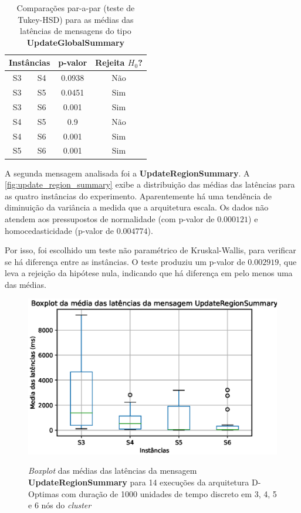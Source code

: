 \begin{table}[ht!]
    \centering
    \caption{Comparações par-a-par (teste de Tukey-HSD) para as médias das latências de mensagens do tipo \textbf{UpdateGlobalSummary}}
    \begin{tabular}{cccc}
    \toprule
    \multicolumn{2}{c}{\textbf{Instâncias}} & \textbf{p-valor} & \textbf{Rejeita $H_0$?}\\
    \midrule
    S3   &  S4  & 0.0938 &  Não \\
    S3   &  S5  & 0.0451 &   Sim \\
    S3   &  S6  &  0.001 &   Sim \\
    S4   &  S5  &    0.9 &  Não \\
    S4   &  S6  &  0.001 &   Sim \\
    S5   &  S6  &  0.001 &   Sim \\
    \bottomrule
    \end{tabular}
    \label{tab:update_global_summary_tukey}
\end{table}

A segunda mensagem analisada foi a \textbf{UpdateRegionSummary}. A \autoref{fig:update_region_summary} exibe a distribuição das médias das latências para as quatro instâncias do experimento. Aparentemente há uma tendência de diminuição da variância a medida que a arquitetura escala. Os dados não atendem aos pressupostos de normalidade (com p-valor de $0.000121$) e homocedasticidade (p-valor de $0.004774$).  

Por isso, foi escolhido um teste não paramétrico de Kruskal-Wallis, para verificar se há diferença entre as instâncias. O teste produziu um p-valor de $0.002919$, que leva a rejeição da hipótese nula, indicando que há diferença em pelo menos uma das médias. 

\begin{figure}
    \centering    
    \caption{\textit{Boxplot} das médias das latências da mensagem \textbf{UpdateRegionSummary} para 14 execuções da arquitetura D-Optimas com duração de 1000 unidades de tempo discreto em 3, 4, 5 e 6 nós do \textit{cluster} }
    \includegraphics[scale=0.8]{imagens/update_region_summary.eps}
    \label{fig:update_region_summary}
\end{figure}


